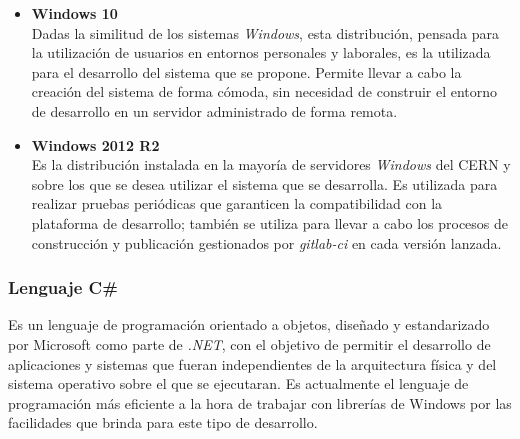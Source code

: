             \begin{itemize}
                \item \textbf{Windows 10} \\
                Dadas la similitud de los sistemas \textit{Windows}, esta distribución, pensada para la utilización de usuarios en entornos personales y laborales, es la utilizada para el desarrollo del sistema que se propone. Permite llevar a cabo la creación del sistema de forma cómoda, sin necesidad de construir el entorno de desarrollo en un servidor administrado de forma remota.
                
                \item \textbf{Windows 2012 R2} \\
                Es la distribución instalada en la mayoría de servidores \textit{Windows} del CERN y sobre los que se desea utilizar el sistema que se desarrolla. Es utilizada para realizar pruebas periódicas que garanticen la compatibilidad con la plataforma de desarrollo; también se utiliza para llevar a cabo los procesos de construcción y publicación gestionados por \textit{gitlab-ci} en cada versión lanzada.
                
            \end{itemize}

        \subsubsection{Lenguaje C\#}
            Es un lenguaje de programación orientado a objetos, diseñado y estandarizado por Microsoft como parte de \textit{.NET}, con el objetivo de permitir el desarrollo de aplicaciones y sistemas que fueran independientes de la arquitectura física y del sistema operativo sobre el que se ejecutaran. Es actualmente el lenguaje de programación más eficiente a la hora de trabajar con librerías de Windows por las facilidades que brinda para este tipo de desarrollo. \cite{csharp}

